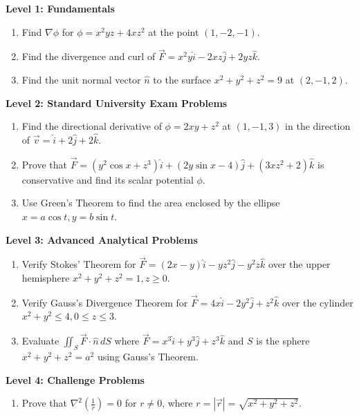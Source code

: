 \begin{practiceset}
\noindent\textbf{Level 1: Fundamentals}
\begin{enumerate}[leftmargin=1.5em]
    \item Find $\nabla\phi$ for $\phi = x^2 y z + 4 x z^2$ at the point $(1, -2, -1)$.
    \item Find the divergence and curl of $\vec{F} = x^2 y\hat{i} - 2xz\hat{j} + 2yz\hat{k}$.
    \item Find the unit normal vector $\hat{n}$ to the surface $x^2 + y^2 + z^2 = 9$ at $(2, -1, 2)$.
\end{enumerate}

\medskip
\noindent\textbf{Level 2: Standard University Exam Problems}
\begin{enumerate}[leftmargin=1.5em, start=4]
    \item Find the directional derivative of $\phi = 2xy + z^2$ at $(1, -1, 3)$ in the direction of $\vec{v} = \hat{i} + 2\hat{j} + 2\hat{k}$.
    \item Prove that $\vec{F} = (y^2\cos x + z^3)\hat{i} + (2y\sin x - 4)\hat{j} + (3xz^2 + 2)\hat{k}$ is conservative and find its scalar potential $\phi$.
    \item Use Green's Theorem to find the area enclosed by the ellipse $x = a\cos t, y = b\sin t$.
\end{enumerate}

\medskip
\noindent\textbf{Level 3: Advanced Analytical Problems}
\begin{enumerate}[leftmargin=1.5em, start=7]
    \item Verify Stokes' Theorem for $\vec{F} = (2x-y)\hat{i} - yz^2\hat{j} - y^2 z\hat{k}$ over the upper hemisphere $x^2+y^2+z^2 = 1, z \ge 0$.
    \item Verify Gauss's Divergence Theorem for $\vec{F} = 4x\hat{i} - 2y^2\hat{j} + z^2\hat{k}$ over the cylinder $x^2+y^2 \le 4, 0 \le z \le 3$.
    \item Evaluate $\iint_S \vec{F}\cdot\hat{n}\,dS$ where $\vec{F} = x^3\hat{i} + y^3\hat{j} + z^3\hat{k}$ and $S$ is the sphere $x^2+y^2+z^2 = a^2$ using Gauss's Theorem.
\end{enumerate}

\medskip
\noindent\textbf{Level 4: Challenge Problems}
\begin{enumerate}[leftmargin=1.5em, start=10]
    \item Prove that $\nabla^2\left(\frac{1}{r}\right) = 0$ for $r \ne 0$, where $r = |\vec{r}| = \sqrt{x^2+y^2+z^2}$.
\end{enumerate}
\end{practiceset}

